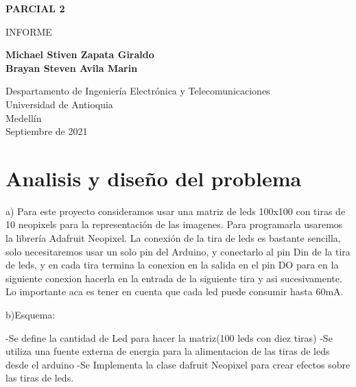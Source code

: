 \documentclass{article}
\begin{document}
\begin{titlepage}
    \begin{center}
        \vspace*{1cm}
            
        \Huge
        \textbf{PARCIAL 2}
            
        \vspace{0.5cm}
        \LARGE
        INFORME
            
        \vspace{1.5cm}
            
        \textbf{Michael Stiven Zapata Giraldo\\Brayan Steven Avila Marin}
            
        \vfill
            
        \vspace{0.8cm}
            
        \Large
        Despartamento de Ingeniería Electrónica y Telecomunicaciones\\
        Universidad de Antioquia\\
        Medellín\\
        Septiembre de 2021
            
    \end{center}
\end{titlepage}

\tableofcontents
\newpage
\section{ Analisis y diseño del problema }\label{intro}

a) Para este proyecto consideramos usar una matriz de leds 100x100 con tiras de 10 neopixels para la representación de las imagenes. Para programarla usaremos la librería Adafruit Neopixel. La conexión de la tira de leds es bastante sencilla, solo necesitaremos usar un solo pin del Arduino, y conectarlo al pin Din de la tira de leds, y en cada tira termina la conexion en la salida en el pin DO para en la siguiente conexion hacerla en la entrada de la siguiente tira y asi sucesivamente. Lo importante aca es tener en cuenta que cada led puede consumir hasta 60mA.

b)Esquema:

-Se define la cantidad de Led para hacer la matriz(100 leds con diez tiras)
-Se utiliza una fuente externa de energia para la alimentacion de las tiras de leds desde el arduino
-Se Implementa la clase dafruit Neopixel para crear efectos sobre las tiras de leds.
\end{document}
